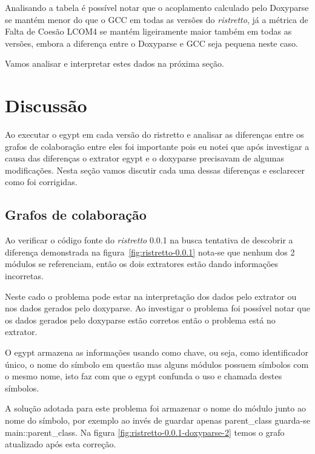 Analisando a tabela é possível notar que o acoplamento calculado pelo Doxyparse
se mantém menor do que o GCC em todas as versões do {\it ristretto}, já a métrica de
Falta de Coesão LCOM4 se mantém ligeiramente maior também em todas as versões,
embora a diferença entre o Doxyparse e GCC seja pequena neste caso.

Vamos analisar e interpretar estes dados na próxima seção.

\section{Discussão} \label{sec:discussao}

Ao executar o egypt em cada versão do ristretto e analisar as diferenças entre
os grafos de colaboração entre eles foi importante pois eu notei que após
investigar a causa das diferenças o extrator egypt e o doxyparse precisavam de
algumas modificações. Nesta seção vamos discutir cada uma dessas diferenças e
esclarecer como foi corrigidas.

\subsection{Grafos de colaboração}

Ao verificar o código fonte do {\it ristretto} 0.0.1 na busca tentativa de
descobrir a diferença demonstrada na figura~\ref{fig:ristretto-0.0.1} nota-se
que nenhum dos 2 módulos se referenciam, então os dois extratores estão dando
informações incorretas.

Neste cado o problema pode estar na interpretação dos dados pelo extrator ou
nos dados gerados pelo doxyparse. Ao investigar o problema foi possível notar
que os dados gerados pelo doxyparse estão corretos então o problema está no
extrator.

O egypt armazena as informações usando como chave, ou seja, como identificador
único, o nome do símbolo em questão mas alguns módulos possuem símbolos com o
mesmo nome, isto faz com que o egypt confunda o uso e chamada destes símbolos.

A solução adotada para este problema foi armazenar o nome do módulo junto ao
nome do símbolo, por exemplo ao invés de guardar apenas parent\_class guarda-se
main::parent\_class. Na figura \ref{fig:ristretto-0.0.1-doxyparse-2} temos o
grafo atualizado após esta correção.

